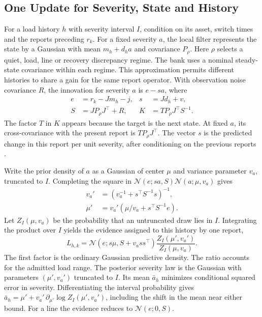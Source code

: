 \subsection{One Update for Severity, State and History}

For a load history $h$ with severity interval $I$, condition on its
asset, switch times and the reports
preceding $r_k$. For a fixed severity $a$, the local filter represents
the state by a Gaussian with mean $m_h+d_h a$ and covariance $P_\rho$.
Here $\rho$ selects a quiet, load, line or recovery discrepancy regime.
The bank uses a nominal steady-state covariance within each regime.
This approximation permits different histories to share a gain for the
same report operator. With observation noise covariance $R$, the
innovation for severity $a$ is $e-sa$, where
\begin{align}
 e&=r_k-Jm_h-j, & s&=Jd_h+v,\nonumber\\
 S&=JP_\rho J^\top+R, & K&=TP_\rho J^\top S^{-1}.
 \label{eq:innovation}
\end{align}
The factor $T$ in $K$ appears because the target is the next state.
At fixed $a$, its cross-covariance with the present report is
$TP_\rho J^\top$. The vector $s$ is the predicted change in this report per unit severity,
after conditioning on the previous reports
\cite{friedland1969bias,willsky1976glr}.

Write the prior density of $a$ as a Gaussian of center $\mu$ and
variance parameter $v_a$, truncated to $I$. Completing the square in
$\mathcal N(e;sa,S)\mathcal N(a;\mu,v_a)$ gives
\begin{align}
 v_a'&=(v_a^{-1}+s^\top S^{-1}s)^{-1},\nonumber\\
 \mu'&=v_a'(\mu/v_a+s^\top S^{-1}e).
 \label{eq:severity-update}
\end{align}
Let $Z_I(\mu,v_a)$ be the probability that an untruncated draw lies in
$I$. Integrating the product over $I$ yields the evidence assigned to
this history by one report,
\begin{equation}
 L_{h,k}=\mathcal N(e;s\mu,S+v_a ss^\top)
           \frac{Z_I(\mu',v_a')}{Z_I(\mu,v_a)}.
 \label{eq:narrative-evidence}
\end{equation}
The first factor is the ordinary Gaussian predictive density. The ratio
accounts for the admitted load range. The posterior severity law is the
Gaussian with parameters $(\mu',v_a')$ truncated to $I$. Its mean
$\bar a_h$ minimizes conditional squared error in severity.
Differentiating the interval probability gives
$\bar a_h=\mu'+v_a'\,\partial_{\mu'}\log Z_I(\mu',v_a')$,
including the shift in the mean near either bound. For a line
the evidence reduces to $\mathcal N(e;0,S)$.

